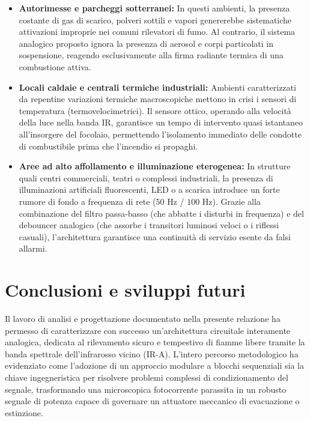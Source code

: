 \documentclass[12pt,a4paper]{article}
\begin{document}
        \begin{itemize}
            \item \textbf{Autorimesse e parcheggi sotterranei:} In questi ambienti, la presenza costante di gas di scarico, polveri sottili e vapori genererebbe sistematiche attivazioni improprie nei comuni rilevatori 
                di fumo. Al contrario, il sistema analogico proposto ignora la presenza di aerosol e corpi particolati in sospensione, reagendo esclusivamente alla firma radiante termica di una combustione attiva.
            \item \textbf{Locali caldaie e centrali termiche industriali:} Ambienti caratterizzati da repentine variazioni termiche macroscopiche mettono in crisi i sensori di temperatura (termovelocimetrici). Il sensore 
                ottico, operando alla velocità della luce nella banda IR, garantisce un tempo di intervento quasi istantaneo all'insorgere del focolaio, permettendo l'isolamento immediato delle condotte di combustibile 
                prima che l'incendio si propaghi.
            \item \textbf{Aree ad alto affollamento e illuminazione eterogenea:} In strutture quali centri commerciali, teatri o complessi industriali, la presenza di illuminazioni artificiali fluorescenti, LED o a scarica 
                introduce un forte rumore di fondo a frequenza di rete ($50\text{ Hz}$ / $100\text{ Hz}$). Grazie alla combinazione del filtro passa-basso (che abbatte i disturbi in frequenza) e del debouncer analogico 
                (che assorbe i transitori luminosi veloci o i riflessi casuali), l'architettura garantisce una continuità di servizio esente da falsi allarmi.
        \end{itemize}


\section{Conclusioni e sviluppi futuri}
    Il lavoro di analisi e progettazione documentato nella presente relazione ha permesso di caratterizzare con successo un'architettura circuitale interamente analogica, dedicata al rilevamento sicuro e tempestivo di fiamme 
    libere tramite la banda spettrale dell'infrarosso vicino (IR-A). L'intero percorso metodologico ha evidenziato come l'adozione di un approccio modulare a blocchi sequenziali sia la chiave ingegneristica per risolvere problemi 
    complessi di condizionamento del segnale, trasformando una microscopica fotocorrente parassita in un robusto segnale di potenza capace di governare un attuatore meccanico di evacuazione o estinzione.
\end{document}
